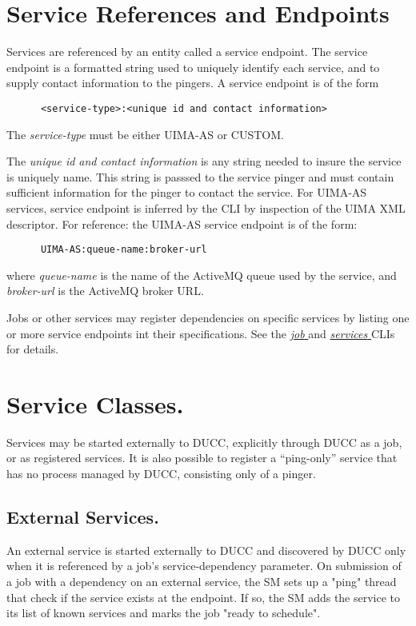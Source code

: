       \section{Service References and Endpoints} 
      \label{sec:service.endpoints}
      Services are referenced by an entity called a service
      endpoint. The service endpoint is a formatted string used to uniquely identify each
      service, and to supply contact information to the pingers.  A service endpoint
      is of the form 
\begin{verbatim}
      <service-type>:<unique id and contact information>
\end{verbatim}
      
      The {\em service-type} must be either UIMA-AS or CUSTOM.
      
      The {\em unique id and contact information} is any string needed to insure the service is
      uniquely name.  This string is passsed to the service pinger and must contain sufficient
      information for the pinger to contact the service.  For UIMA-AS services, service endpoint is
      inferred by the CLI by inspection of the UIMA XML descriptor.  For reference: the UIMA-AS
      service endpoint is of the form:
\begin{verbatim}
      UIMA-AS:queue-name:broker-url
\end{verbatim}
      where {\em queue-name} is the name of the ActiveMQ queue used by the service, and {\em broker-url}
      is the ActiveMQ broker URL.

      Jobs or other services may register dependencies on specific services by listing one or more
      service endpoints int their specifications. See the 
      \hyperref[sec:cli.ducc-submit]{\em job } and 
      \hyperref[sec:cli.ducc-services]{\em services } CLIs for details.
      
      
      \section{Service Classes.} 
      \label{sec:service.classes}
      Services may be started externally to DUCC, explicitly through
      DUCC as a job, or as registered services.  It is also possible to register a ``ping-only''
      service that has no process managed by DUCC, consisting only of a pinger.

      \subsection{External Services.} 
      \label{sec:services.external}
      An external service is started externally to DUCC and discovered by DUCC only
      when it is referenced by a job's service-dependency parameter. On submission of a job with a
      dependency on an external service, the SM sets up a "ping" thread that check if the service
      exists at the endpoint. If so, the SM adds the service to its list of known services and marks
      the job "ready to schedule". 

